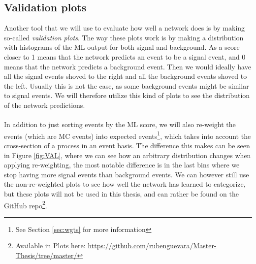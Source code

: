 \documentclass[12pt, a4paper]{book}
\begin{document}
\subsection{Validation plots}\label{sec:validation}
Another tool that we will use to evaluate how well a network does is by making so-called \textit{validation plots}. The way these plots work is by making a distribution with histograms of the ML output for both signal and background. As a score closer to 1 means that the network predicts an event to be a signal event, and 0 means that the network predicts a background event. Then we would ideally have all the signal events shoved to the right and all the background events shoved to the left. 
Usually this is not the case, as some background events might be similar to signal events. We will therefore utilize this kind of plots to see the distribution of the network predictions. \\
\\In addition to just sorting events by the ML score, we will also re-weight the events (which are MC events) into expected events\footnote{See Section \ref{sec:wgts} for more information}, which takes into account the cross-section of a process in an event basis. The difference this makes can be seen in Figure \ref{fig:VAL}, where we can see how an arbitrary distribution changes when applying re-weighting, the most notable difference is in the last bins where we stop having more signal events than background events. 
We can however still use the non-re-weighted plots to see how well the network has learned to categorize, but these plots will not be used in this thesis, and can rather be found on the GitHub repo\footnote{Available in Plots here: \href{https://github.com/rubenguevara/Master-Thesis/tree/master/}{https://github.com/rubenguevara/Master-Thesis/tree/master/}}. \\
\end{document}
